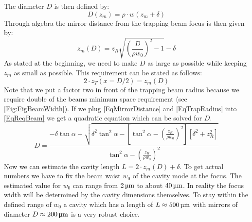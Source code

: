 The diameter $D$ is then defined by:
\begin{equation}\label{BeamDiameter}
	D(z_{\si{m}})=\rho\cdot w(z_{\si{m}}+\delta)
\end{equation}
Through algebra the mirror distance from the trapping beam focus is then given by:
\begin{equation}\label{EqMirrorDistance}
	z_{\si{m}}(D)=z_{\si{R}}\sqrt{\left(\frac{D}{\rho w_0}\right)^2-1}-\delta
\end{equation}
As stated at the beginning, we need to make $D$ as large as possible while keeping $z_{\si{m}}$ as small as possible. This requirement can be stated as follows:
\begin{equation}\label{EqReqBeam}
	2\cdot z_{\si{T}}(x=D/2)=z_{\si{m}}(D)
\end{equation}
Note that we put a factor two in front of the trapping beam radius because we require double of the beams minimum space requirement (see \autoref{Fig:FigBeamWidth}). If we plug \autoref{EqMirrorDistance} and \autoref{EqTrapRadius} into \autoref{EqReqBeam} we get a quadratic equation which can be solved for $D$.
\begin{equation}
	D=\frac{-\delta\tan\alpha+\sqrt{\delta^2\tan^2\alpha -\left[\tan^2\alpha-\left(\frac{z_{\si{R}}}{\rho w_0}\right)^2\right]\left[\delta^2+z_{\si{R}}^2\right]}}{\tan^2\alpha-\left(\frac{z_{\si{R}}}{\rho w_0}\right)^2}
\end{equation}
Now we can estimate the cavity length $L=2\cdot z_{\si{m}}(D)+\delta$. To get actual numbers we have to fix the beam waist $w_0$ of the cavity mode at the focus. The estimated value for $w_0$ can range from $2\um$ to about $40\um$. In reality the focus width will be determined by the cavity dimensions themselves. To stay within the defined range of $w_0$ a cavity which has a length of $L\approx 500\um$ with mirrors of diameter $D\approx 200\um$ is a very robust choice.

